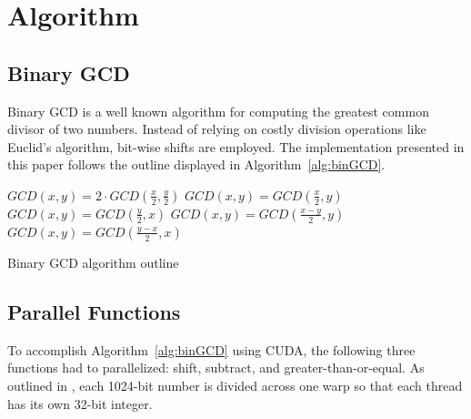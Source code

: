 \documentclass[smallextended]{svjour3}       %
\begin{document}


\section{Algorithm}
\label{sec:alg}

\subsection{Binary GCD}
\label{subsec:binGCD}
Binary GCD is a well known algorithm for computing the greatest common divisor 
of two numbers. Instead of relying on costly division operations like Euclid's 
algorithm, bit-wise shifts are employed. The implementation
presented in this paper follows the outline displayed in
Algorithm~\ref{alg:binGCD}.

\begin{algorithm}
   \nl{} {
      \nl{} {
         \nl$GCD(x, y) = 2 \cdot GCD(\frac{x}{2}, \frac{y}{2})$\;
      }\nl{} {
         \nl$GCD(x, y) = GCD(\frac{x}{2}, y)$\;
      }\nl{} {
         \nl$GCD(x, y) = GCD(\frac{y}{2}, x)$\;
      }\nl{} {
         \nl{} {
            \nl$GCD(x, y) = GCD(\frac{x - y}{2}, y)$\;
         }{
            \nl$GCD(x, y) = GCD(\frac{y - x}{2}, x)$\;
        }
      }
   }
   \caption{Binary GCD algorithm outline}
   \label{alg:binGCD}
\end{algorithm}

\subsection{Parallel Functions}
\label{subsec:parfunc}
To accomplish Algorithm~\ref{alg:binGCD} using CUDA, the following three 
functions had to parallelized: shift, subtract, and greater-than-or-equal. As 
outlined in \cite{fujimoto2009high}, each 1024-bit number is divided across one 
warp so that each thread has its own 32-bit integer. 
\end{document}
